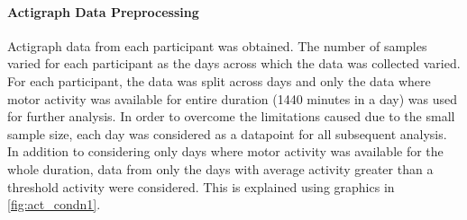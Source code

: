 \documentclass[11pt,a4paper]{article}
\newcommand{\noi}{\noindent}
\begin{document}
% 
% 

\paragraph{Actigraph Data Preprocessing}
Actigraph data from each participant was obtained. The number of samples varied for each participant as the days across which the data was collected varied. For each participant, the data was split across days and only the data where motor activity was available for entire duration (1440 minutes in a day) was used for further analysis. In order to overcome the limitations caused due to the small sample size, each day was considered as a datapoint for all subsequent analysis. In addition to considering only days where motor activity was available for the whole duration, data from only the days with average activity greater than a threshold activity were considered. This is explained using graphics in \autoref{fig:act_condn1}.
\end{document}
